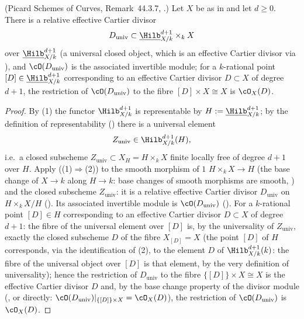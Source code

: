 \begin{lemma}
\label{lem:pc-universal-divisor}
(Picard Schemes of Curves, Remark~44.3.7,
.)  Let $X$ be as
in  and let $d\geq0$.  There is a relative
effective Cartier divisor
\[
D_{\mathrm{univ}}\subset \underline{\Hilb}^{d+1}_{X/k}\times_kX
\]
over $\underline{\Hilb}^{d+1}_{X/k}$ (a universal closed object, which is
an effective Cartier divisor via ), and
$\cO(D_{\mathrm{univ}})$ is the associated invertible module; for a
$k$-rational point $[D]\in\underline{\Hilb}^{d+1}_{X/k}$ corresponding to
an effective Cartier divisor $D\subset X$ of degree $d+1$, the restriction
of $\cO(D_{\mathrm{univ}})$ to the fibre $[D]\times X\cong X$ is
$\cO_X(D)$.
\end{lemma}
\begin{proof}
By (1) the functor $\Hilb^{d+1}_{X/k}$ is
representable by
$H:=\underline{\Hilb}^{d+1}_{X/k}$; by the definition of
representability () there is a universal
element
\[
Z_{\mathrm{univ}}\in\Hilb^{d+1}_{X/k}(H),
\]
i.e.\ a closed subscheme $Z_{\mathrm{univ}}\subset X_H=H\times_kX$
finite locally free of degree $d+1$ over $H$.  Apply
 ((1)$\Rightarrow$(2)) to the smooth
morphism of  $1$
$H\times_kX\to H$ (the base change of $X\to k$ along $H\to k$: base
changes of smooth morphisms are smooth,
) and
the closed subscheme $Z_{\mathrm{univ}}$: it is a relative effective
Cartier divisor $D_{\mathrm{univ}}$ on $H\times_kX/H$
().  Its associated invertible
module is $\cO(D_{\mathrm{univ}})$
().  For a $k$-rational point
$[D]\in H$ corresponding to an effective Cartier divisor $D\subset X$
of degree $d+1$: the fibre of the universal element over $[D]$ is, by
the universality of $Z_{\mathrm{univ}}$, exactly the closed subscheme
$D$ of the fibre
$X_{[D]}=X$ (the point $[D]$ of $H$ corresponds, via the
identification of (2), to the element $D$ of
$\Hilb^{d+1}_{X/k}(k)$: the fibre of the universal object over $[D]$
is that element, by the very definition of universality); hence the
restriction of $D_{\mathrm{univ}}$ to the fibre
$\{[D]\}\times X\cong X$ is the effective Cartier divisor $D$ and, by
the base change property of the divisor module
(, or directly:
$\cO(D_{\mathrm{univ}})|_{\{[D]\}\times X}
=\cO_X(D)$), the restriction of
$\cO(D_{\mathrm{univ}})$ is $\cO_X(D)$.
\end{proof}



